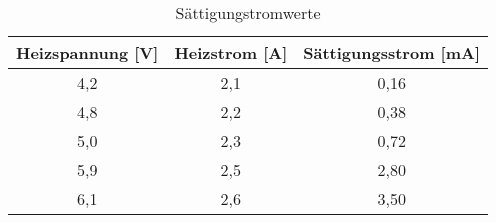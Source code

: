 \begin{table}[h]
	\begin{center}
		\begin{tabular}{ccc}
			Heizspannung [V] & Heizstrom [A] & Sättigungsstrom [mA]\\ \hline
			4,2 &2,1 &0,16\\
			4,8 &2,2 &0,38\\
			5,0 &2,3 &0,72\\
			5,9 &2,5 &2,80\\
			6,1 &2,6 &3,50
		\end{tabular}
		\caption{Sättigungstromwerte}
		\label{tabis}
	\end{center}
\end{table}